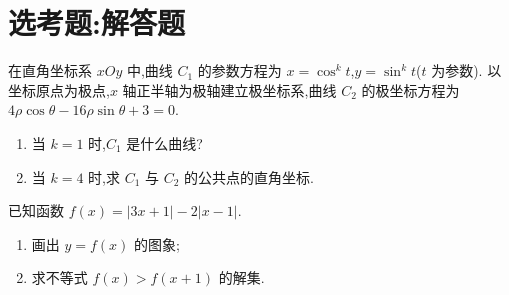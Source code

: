 \section{选考题:解答题}

\begin{problem}
在直角坐标系 \(xOy\) 中,曲线 \(C_1\) 的参数方程为 \(x=\cos^k t\),\(y=\sin^k t\)(\(t\) 为参数). 以坐标原点为极点,\(x\) 轴正半轴为极轴建立极坐标系,曲线 \(C_2\) 的极坐标方程为 \(4\rho\cos\theta-16\rho\sin\theta+3=0\).

\begin{enumerate}
\item 当 \(k=1\) 时,\(C_1\) 是什么曲线?

\item 当 \(k=4\) 时,求 \(C_1\) 与 \(C_2\) 的公共点的直角坐标.
\end{enumerate}
\end{problem}

\begin{problem}
已知函数 \(f(x)=\left\lvert 3x+1 \right\rvert-2\left\lvert x-1 \right\rvert\).

\begin{enumerate}
\item 画出 \(y=f(x)\) 的图象;

\item 求不等式 \(f(x)>f(x+1)\) 的解集.
\end{enumerate}

\end{problem}

